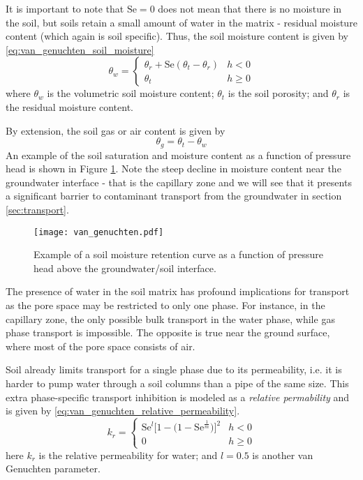 It is important to note that $\mathrm{Se} = 0$ does not mean that there is no moisture in the soil, but soils retain a small amount of water in the matrix - residual moisture content (which again is soil specific).
Thus, the soil moisture content is given by \eqref{eq:van_genuchten_soil_moisture}
\begin{equation}\label{eq:van_genuchten_soil_moisture}
  \theta_w =
    \begin{cases}
      \theta_r + \mathrm{Se}(\theta_t - \theta_r) & h < 0 \\
      \theta_t & h \geq 0
    \end{cases}
\end{equation}
where $\theta_w$ is the volumetric soil moisture content;
$\theta_t$ is the soil porosity;
and $\theta_r$ is the residual moisture content.\par

By extension, the soil gas or air content is given by
\begin{equation}\label{eq:gas_porosity}
  \theta_g = \theta_t - \theta_w
\end{equation}
An example of the soil saturation and moisture content as a function of pressure head is shown in Figure \ref{fig:retention_curve}.
Note the steep decline in moisture content near the groundwater interface - that is the capillary zone and we will see that it presents a significant barrier to contaminant transport from the groundwater in section \ref{sec:transport}.\par

\begin{figure}
  \texttt{[image: van\_genuchten.pdf]}
  \caption{Example of a soil moisture retention curve as a function of pressure head above the groundwater/soil interface.}
  \label{fig:retention_curve}
\end{figure}

The presence of water in the soil matrix has profound implications for transport as the pore space may be restricted to only one phase.
For instance, in the capillary zone, the only possible bulk transport in the water phase, while gas phase transport is impossible.
The opposite is true near the ground surface, where most of the pore space consists of air.\par

Soil already limits transport for a single phase due to its permeability, i.e. it is harder to pump water through a soil columns than a pipe of the same size.
This extra phase-specific transport inhibition is modeled as a \textit{relative permability} and is given by \eqref{eq:van_genuchten_relative_permeability}.
\begin{equation}\label{eq:van_genuchten_relative_permeability}
  k_r =
    \begin{cases}
      \mathrm{Se}^l \big[ 1 - \big( 1 - \mathrm{Se}^\frac{1}{m} \big) \big]^2 & h < 0 \\
      0 & h \geq 0
    \end{cases}
\end{equation}
here $k_r$ is the relative permeability for water; %
and $l = 0.5$ is another van Genuchten parameter.\par %

